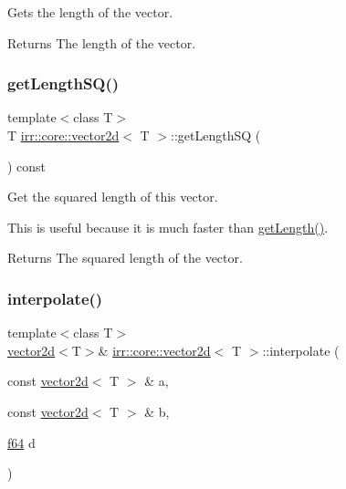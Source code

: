 Gets the length of the vector. 

\begin{DoxyReturn}{Returns}
The length of the vector. 
\end{DoxyReturn}
\mbox{\label{classirr_1_1core_1_1vector2d_ac08fae4770172d11cb2811f18fec2d23}} 
\subsubsection{\texorpdfstring{get\+Length\+S\+Q()}{getLengthSQ()}}
{\footnotesize\ttfamily template$<$class T$>$ \\
T \hyperlink{classirr_1_1core_1_1vector2d}{irr\+::core\+::vector2d}$<$ T $>$\+::get\+Length\+SQ (\begin{DoxyParamCaption}{ }\end{DoxyParamCaption}) const\hspace{0.3cm}{\ttfamily [inline]}}



Get the squared length of this vector. 

This is useful because it is much faster than \hyperlink{classirr_1_1core_1_1vector2d_a84b5741d21aa24cfb71b14e350226ab9}{get\+Length()}. \begin{DoxyReturn}{Returns}
The squared length of the vector. 
\end{DoxyReturn}
\mbox{\label{classirr_1_1core_1_1vector2d_a85bc48f5c313764fd56b51c730a62210}} 
\subsubsection{\texorpdfstring{interpolate()}{interpolate()}}
{\footnotesize\ttfamily template$<$class T$>$ \\
\hyperlink{classirr_1_1core_1_1vector2d}{vector2d}$<$T$>$\& \hyperlink{classirr_1_1core_1_1vector2d}{irr\+::core\+::vector2d}$<$ T $>$\+::interpolate (\begin{DoxyParamCaption}\item[{const \hyperlink{classirr_1_1core_1_1vector2d}{vector2d}$<$ T $>$ \&}]{a,  }\item[{const \hyperlink{classirr_1_1core_1_1vector2d}{vector2d}$<$ T $>$ \&}]{b,  }\item[{\hyperlink{namespaceirr_a1325b02603ad449f92c68fc640af9b28}{f64}}]{d }\end{DoxyParamCaption})\hspace{0.3cm}{\ttfamily [inline]}}



